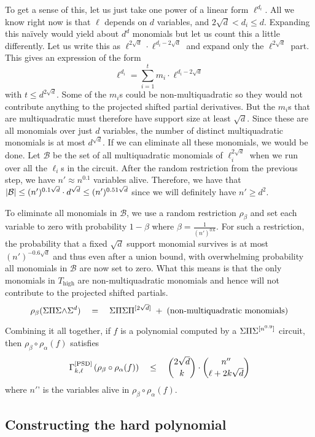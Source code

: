 To get a sense of this, let us just take one power of a linear form $\ell^{d_i}$. All we know right now is that $\ell$ depends on $d$ variables, and $2\sqrt{d} < d_i \leq d$. Expanding this na\"ively would yield about $d^d$ monomials but let us count this a little differently. Let us write this as $\ell^{2\sqrt{d}} \cdot \ell^{d_i - 2\sqrt{d}}$ and expand only the $\ell^{2\sqrt{d}}$ part. This gives an expression of the form
\[
\ell^{d_i} = \sum_{i=1}^t m_i \cdot \ell^{d_i - 2\sqrt{d}}
\]
with $t \leq d^{2\sqrt{d}}$. Some of the $m_i$s could be non-multiquadratic so they would not contribute anything to the projected shifted partial derivatives. But the $m_i$s that are multiquadratic must therefore have support size at least $\sqrt{d}$. Since these are all monomials over just $d$ variables, the number of distinct multiquadratic monomials is at most $d^{\sqrt{d}}$. If we can eliminate all these monomials, we would be done. Let $\mathcal{B}$ be the set of all multiquadratic monomials of $\ell_i^{2\sqrt{d}}$ when we run over all the $\ell_i$s in the circuit. After the random restriction from the previous step, we have $n' \approx n^{0.1}$ variables alive. Therefore, we have that $\left|\mathcal{B}\right| \leq (n')^{0.1\sqrt{d}} \cdot d^{\sqrt{d}} \leq (n')^{0.51 \sqrt{d}}$ since we will definitely have $n' \geq d^2$. 

To eliminate all monomials in $\mathcal{B}$, we use a random restriction $\rho_\beta$ and set each variable to zero with probability $1 - \beta$ where $\beta = \frac{1}{(n')^{0.6}}$. For such a restriction, the probability that a fixed $\sqrt{d}$ support monomial survives is at most $(n')^{-0.6\sqrt{d}}$ and thus even after a union bound, with overwhelming probability all monomials in $\mathcal{B}$ are now set to zero. What this means is that the only monomials in $T_{\text{high}}$ are non-multiquadratic monomials and hence will not contribute to the projected shifted partials. 
\[
\rho_\beta(\Sigma\Pi\Sigma\mathord{\wedge}\Sigma^{d}) \quad = \quad \Sigma\Pi\Sigma\Pi^{[2\sqrt{d}]} \;+\; (\text{non-multiquadratic monomials})
\]

Combining it all together, if $f$ is a polynomial computed by a $\Sigma\Pi\Sigma^{[n^{0.9}]}$ circuit, then $\rho_\beta \circ \rho_\alpha (f)$ satisfies
\[
\Gamma^{\mathrm{[PSD]}}_{k,\ell}\left(\rho_\beta \circ \rho_\alpha(f)\right) \quad \leq \quad \binom{2\sqrt{d}}{k} \cdot \binom{n''}{\ell + 2k\sqrt{d}}
\]
where $n'$' is the variables alive in $\rho_\beta \circ \rho_\alpha(f)$. 

\subsection*{Constructing the hard polynomial}

